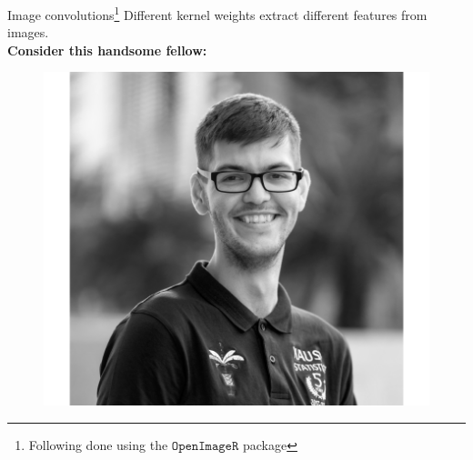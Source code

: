 \documentclass{beamer}
\begin{document}
\begin{frame}{Image convolutions\footnote{Following done using the $\texttt{OpenImageR}$ package}}
Different kernel weights extract different features from images.\\
\textbf{Consider this handsome fellow:}
\begin{figure}
\includegraphics[width=0.45\linewidth]{Images/conv1.png}
\end{figure}
\end{frame}
\end{document}
